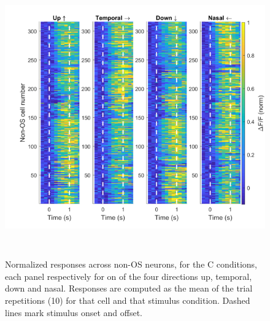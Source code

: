 \begin{figure}[H] \centering \includegraphics[width=12cm,height=12cm,keepaspectratio]{Figures/7.Results/finalPopulation/sel/popPlots_nonOS_centerOnly.png} 
\caption{Normalized responses across non-OS neurons, for the C conditions, each panel respectively for on of the four directions up, temporal, down and nasal. Responses are computed as the mean of the trial repetitions (10) for that cell and that stimulus condition. Dashed lines mark stimulus onset and offset.} 
\label{nonOS}
\end{figure}


